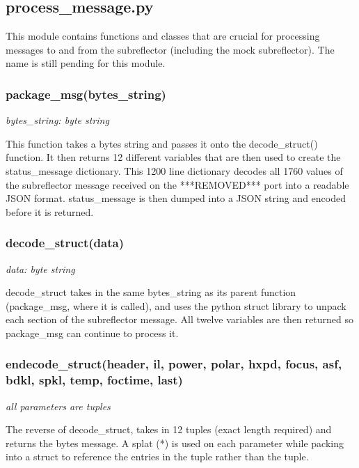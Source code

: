 \documentclass{article}
\begin{document}
\newpage
\subsection{process\_message.py}

This module contains functions and classes that are crucial for processing messages to and from the subreflector (including the mock subreflector). The name is still pending for this module.
 
\subsubsection*{package\_msg(bytes\_string)}
\emph{bytes\_string: byte string}
\vspace{10pt}

This function takes a bytes string and passes it onto the decode\_struct() function. It then returns 12 different variables that are then used to create the status\_message dictionary. This 1200 line dictionary decodes all 1760  values of the subreflector message received on the ***REMOVED*** port into a readable JSON format. status\_message is then dumped into a JSON string and encoded before it is returned.

\subsubsection*{decode\_struct(data)}
\emph{data: byte string}
\vspace{10pt}

decode\_struct takes in the same bytes\_string as its parent function (package\_msg, where it is called), and uses the python struct library to unpack each section of the subreflector message. All twelve variables are then returned so package\_msg can continue to process it.

\subsubsection*{endecode\_struct(header, il, power, polar, hxpd, focus, asf, bdkl, spkl, temp, foctime, last)}
\emph{all parameters are tuples}
\vspace{10pt}

The reverse of decode\_struct, takes in 12 tuples (exact length required) and returns the bytes message. A splat (*) is used on each parameter while packing into a struct to reference the entries in the tuple rather than the tuple. 
\vspace{5pt}
\end{document}
